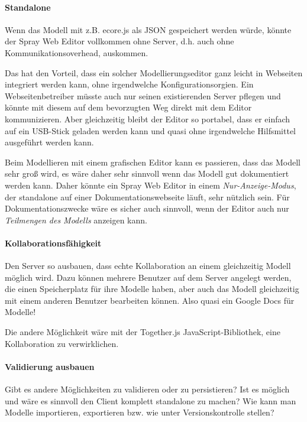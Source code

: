\paragraph{Standalone}

Wenn das Modell mit z.B. ecore.js als JSON gespeichert werden würde,
könnte der Spray Web Editor vollkommen ohne Server, d.h. auch ohne
Kommunikationsoverhead, auskommen.

Das hat den Vorteil, dass ein solcher Modellierungseditor ganz leicht
in Webseiten integriert werden kann, ohne irgendwelche
Konfigurationsorgien. Ein Webseitenbetreiber müsste auch nur seinen existierenden
Server pflegen und könnte mit diesem auf dem bevorzugten Weg direkt mit
dem Editor kommunizieren. Aber gleichzeitig bleibt der Editor so portabel,
dass er einfach auf ein USB-Stick geladen werden kann und quasi ohne irgendwelche
Hilfsmittel ausgeführt werden kann.

Beim Modellieren mit einem grafischen Editor kann es passieren, dass das
Modell sehr groß wird, es wäre daher sehr sinnvoll wenn das Modell
gut dokumentiert werden kann. Daher könnte ein Spray Web Editor in einem
\emph{Nur-Anzeige-Modus}, der standalone auf einer Dokumentationswebseite
läuft, sehr nützlich sein.
Für Dokumentationszwecke wäre es sicher auch sinnvoll, wenn der Editor
auch nur \emph{Teilmengen des Modells} anzeigen kann.


\paragraph{Kollaborationsfähigkeit}

Den Server so ausbauen, dass echte Kollaboration an einem gleichzeitig
Modell möglich wird.
Dazu können mehrere Benutzer auf dem Server angelegt werden, die einen
Speicherplatz für ihre Modelle haben, aber auch das Modell gleichzeitig
mit einem anderen Benutzer bearbeiten können.
Also quasi ein Google Docs für Modelle!

Die andere Möglichkeit wäre mit der Together.js JavaScript-Bibliothek,
eine Kollaboration zu verwirklichen.

\paragraph{Validierung ausbauen}

Gibt es andere Möglichkeiten zu validieren oder zu persistieren?
Ist es möglich und wäre es sinnvoll den Client komplett standalone
zu machen?
Wie kann man Modelle importieren, exportieren bzw. wie unter
Versionskontrolle stellen?

